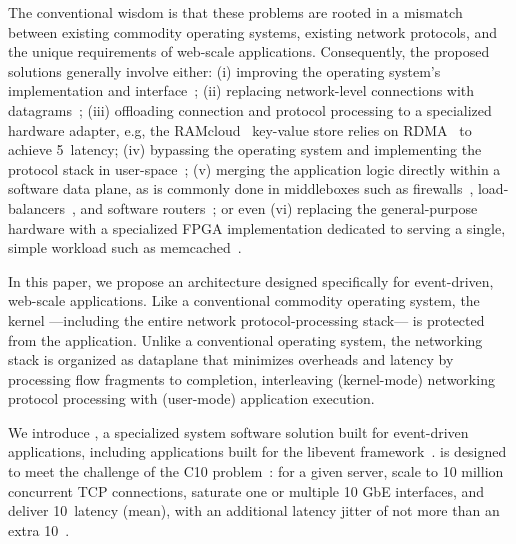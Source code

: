 The conventional wisdom is that these problems are rooted in a
mismatch between existing commodity operating systems, existing
network protocols, and the unique requirements of web-scale
applications.  Consequently, the proposed solutions generally involve
either: 
(i) improving the operating system's implementation and
interface~\cite{DBLP:conf/eurosys/PesterevSZM12,han2012megapipe}; 
(ii) replacing network-level connections with
datagrams~\cite{nishtala2013scaling}; 
(iii) offloading connection and protocol processing to a specialized hardware adapter, e.g, the
RAMcloud~\cite{DBLP:conf/sosp/OngaroRSOR11} key-value store relies on
RDMA~\cite{rdma-user-manual} to achieve 5~\microsecond latency; (iv)
bypassing the operating system and implementing the protocol stack in
user-space~\cite{jeong2014mtcp}; (v) merging the application logic
directly within a software data plane, as is commonly done in
middleboxes such as firewalls~\cite{missing},
load-balancers~\cite{missing}, and software
routers~\cite{DBLP:journals/tocs/KohlerMCJK00,DBLP:conf/sosp/DobrescuEACFIKMR09};
or even (vi) replacing the general-purpose hardware with a specialized
FPGA implementation dedicated to serving a single, simple workload
such as memcached~\cite{DBLP:conf/fpga/ChalamalasettiLWARM13}.

In this paper, we propose an architecture designed specifically for
event-driven, web-scale applications.  Like a conventional commodity
operating system, the kernel  ---including the entire network protocol-processing stack--- is protected from the application.  Unlike a
conventional operating system, the networking stack is organized as
dataplane that minimizes overheads and latency by processing flow
fragments to completion, interleaving (kernel-mode) networking
protocol processing with (user-mode) application execution.

We introduce \ix, a specialized system software solution built for
event-driven applications, including applications built for the
libevent framework~\cite{provos2003libevent}.  \ix is designed to meet the
challenge of the C10 problem~\cite{theC10Mproblem}: for a given
server, scale to 10 million concurrent TCP connections, saturate one
or multiple 10 GbE interfaces, and deliver 10~\microsecond latency
(mean), with an additional latency jitter of not more than an extra
10~\microsecond.

